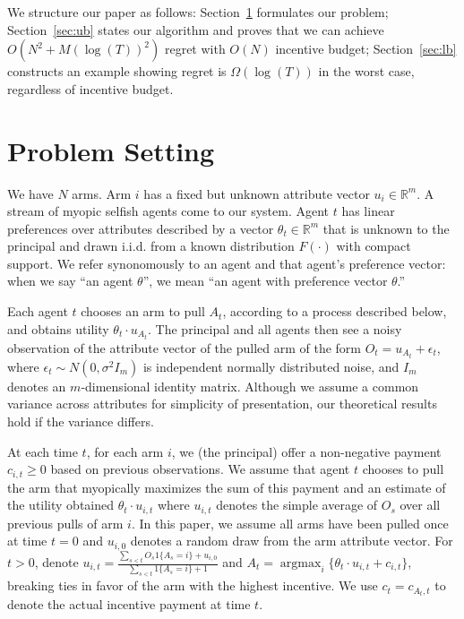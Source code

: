 \documentclass{article}
\newcommand{\argmax}{\mathop{\mathrm{argmax}}}
\begin{document}
We structure our paper as follows: Section~\ref{sec:prob} formulates our problem; Section~\ref{sec:ub} states our algorithm and proves that we can achieve $O(N^2+M(\log(T))^2)$ regret with $O(N)$ incentive budget; Section~\ref{sec:lb} constructs an example showing regret is $\Omega(\log(T))$ in the worst case, regardless of incentive budget.




\section{Problem Setting}
\label{sec:prob}

We have $N$ arms. Arm $i$ has a fixed but unknown attribute vector $u_i\in \mathbb{R}^{m}$. 
A stream of myopic selfish agents come to our system.  Agent $t$ has linear preferences over attributes described by a vector $\theta_t \in \mathbb{R}^m$ that is unknown to the principal and drawn i.i.d. from a known distribution $F(\cdot)$ with compact support. We refer synonomously to an agent and that agent's preference vector: when we say ``an agent $\theta$'', we mean ``an agent with preference vector $\theta$.''

Each agent $t$ chooses an arm to pull $A_t$, according to a process described below, and obtains utility $\theta_t \cdot u_{A_{t}}$.  The principal and all agents then see a noisy observation of the attribute vector of the pulled arm of the form $O_t=u_{A_{t}}+\epsilon_{t}$, where $\epsilon_t\sim N(0, \sigma^2 I_{m})$ is independent normally distributed noise, and $I_m$ denotes an $m$-dimensional identity matrix.  Although we assume a common variance across attributes for simplicity of presentation, our theoretical results hold if the variance differs.

At each time $t$, for each arm $i$, we (the principal) offer a non-negative payment $c_{i,t}\geq 0$ based on previous observations.
We assume that agent $t$ chooses to pull the arm that myopically maximizes the sum of this payment and an estimate of the utility obtained $\theta_t \cdot u_{i,t}$ where $u_{i,t}$ denotes the simple average of $O_s$ over all previous pulls of arm $i$. In this paper, we assume all arms have been pulled once at time $t=0$ and $u_{i,0}$ denotes a random draw from the arm attribute vector. For $t>0$, denote $u_{i,t} = \frac{\sum_{s<t} O_s 1\{A_s = i\} + u_{i,0}}{\sum_{s<t} 1\{A_s = i\}+1}$ and $A_t=\argmax_{i}\{\theta_t\cdot u_{i,t}+c_{i,t}\}$, breaking ties in favor of the arm with the highest incentive.  We use $c_t=c_{A_{t},t}$ to denote the actual incentive payment at time $t$.
\end{document}
